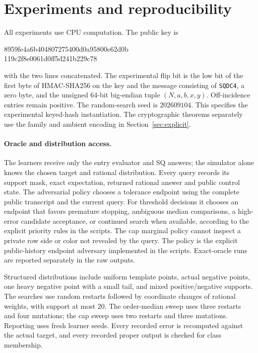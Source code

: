 \section{Experiments and reproducibility}\label{app:experiments}
All experiments use CPU computation. The public key is
\begin{center}\small\ttfamily
8959fe4a6b404807275400d0a95800e62d0b\\
119c2f8e0061d0ff5d241b229c78
\end{center}
with the two lines concatenated. The experimental flip bit is the low bit of the first byte of HMAC-SHA256 on the key and the message consisting of \texttt{SQDC4}, a zero byte, and the unsigned 64-bit big-endian tuple $(N,a,b,x,y)$. Off-incidence entries remain positive. The random-search seed is $202609104$. This specifies the experimental keyed-hash instantiation. The cryptographic theorems separately use the family and ambient encoding in Section~\ref{sec:explicit}.

\paragraph{Oracle and distribution access.}
The learners receive only the entry evaluator and SQ answers; the simulator alone knows the chosen target and rational distribution. Every query records its support mask, exact expectation, returned rational answer and public control state. The adversarial policy chooses a tolerance endpoint using the complete public transcript and the current query. For threshold decisions it chooses an endpoint that favors premature stopping, ambiguous median comparisons, a high-error candidate acceptance, or continued search when available, according to the explicit priority rules in the scripts. The cap marginal policy cannot inspect a private row side or color not revealed by the query. The policy is the explicit public-history endpoint adversary implemented in the scripts. Exact-oracle runs are reported separately in the raw outputs.

Structured distributions include uniform template points, actual negative points, one heavy negative point with a small tail, and mixed positive/negative supports. The searches use random restarts followed by coordinate changes of rational weights, with support at most 20. The order-median sweep uses three restarts and four mutations; the cap sweep uses two restarts and three mutations. Reporting uses fresh learner seeds. Every recorded error is recomputed against the actual target, and every recorded proper output is checked for class membership.

